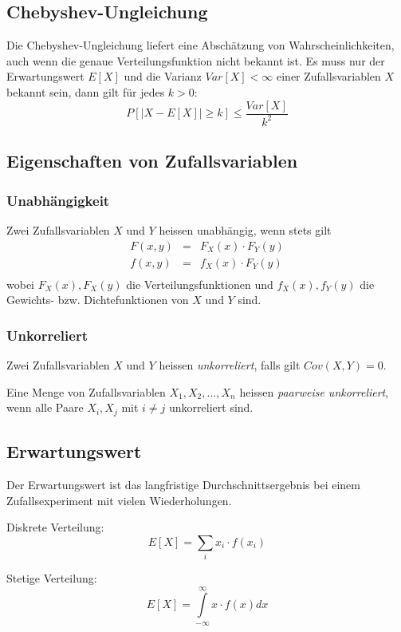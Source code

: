 \documentclass[10pt,a4paper,twocolumn]{article}
\begin{document}
\subsection{Chebyshev-Ungleichung}
Die Chebyshev-Ungleichung liefert eine Abschätzung von Wahrscheinlichkeiten, auch wenn die genaue Verteilungsfunktion nicht bekannt ist. Es muss nur der Erwartungswert $E[X]$ und die Varianz $Var[X] < \infty$ einer Zufallsvariablen $X$ bekannt sein, dann gilt für jedes $k > 0$:
\[
P\left[|X - E[X]| \geq k \right] \leq \frac{Var[X]}{k^2}
\]

\subsection{Eigenschaften von Zufallsvariablen}

\subsubsection{Unabhängigkeit}
Zwei Zufallsvariablen $X$ und $Y$ heissen unabhängig, wenn stets gilt
\[
\begin{array}{rcl}
	F(x,y) & = & F_X(x) \cdot F_Y(y) \\
	f(x,y) & = & f_X(x) \cdot F_Y(y) \\
\end{array}
\]
wobei $F_X(x), F_X(y)$ die Verteilungsfunktionen und $f_X(x), f_Y(y)$ die Gewichts- bzw. Dichtefunktionen von $X$ und $Y$ sind.

\subsubsection{Unkorreliert}
Zwei Zufallsvariablen $X$ und $Y$ heissen \emph{unkorreliert}, falls gilt $Cov(X,Y)=0$.

Eine Menge von Zufallsvariablen $X_1,X_2,...,X_n$ heissen \emph{paarweise unkorreliert}, wenn alle Paare $X_i,X_j$ mit $i\neq j$ unkorreliert sind.

\subsection{Erwartungswert}
Der Erwartungswert ist das langfristige Durchschnittsergebnis bei einem Zufallsexperiment mit vielen Wiederholungen.

\vspace{10pt}

Diskrete Verteilung:
\[
E[X]=\sum\limits_{i} x_i\cdot f(x_i)
\]

Stetige Verteilung:
\[
E[X]=\int\limits_{-\infty}^{\infty}x\cdot f(x)dx
\]
\end{document}
